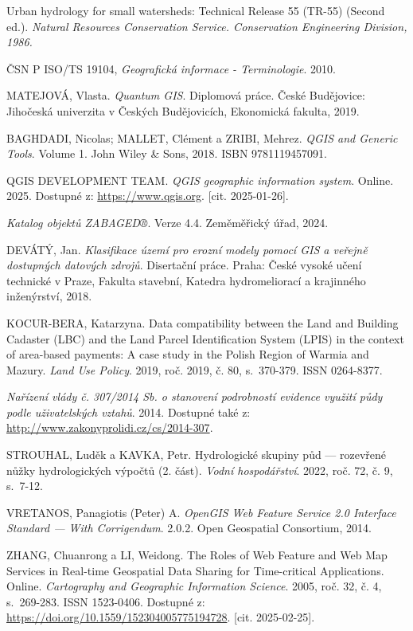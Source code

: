 \documentclass[a4paper,oneside,12pt]{book}
\begin{document}
\begin{thebibliography}{1}
Urban hydrology for small watersheds: Technical Release 55 (TR-55) (Second ed.).
\textit{ Natural Resources Conservation Service. Conservation Engineering Division, 1986.}


ČSN P ISO/TS 19104, \textit{Geografická informace - Terminologie}. 2010.

MATEJOVÁ, Vlasta. \textit{Quantum GIS}. Diplomová práce. České Budějovice: Jihočeská univerzita v Českých Budějovicích, Ekonomická fakulta, 2019.

BAGHDADI, Nicolas; MALLET, Clément a ZRIBI, Mehrez. \textit{QGIS and Generic Tools}. Volume 1. John Wiley \& Sons, 2018. ISBN 9781119457091.

QGIS DEVELOPMENT TEAM. \textit{QGIS geographic information system}. Online. 2025. Dostupné z: \url{https://www.qgis.org}. [cit. 2025-01-26].

\textit{Katalog objektů ZABAGED®}. Verze 4.4. Zeměměřický úřad, 2024.


DEVÁTÝ, Jan. \textit{Klasifikace území pro erozní modely pomocí GIS a veřejně dostupných datových zdrojů}. Disertační práce. Praha: České vysoké učení technické v Praze, Fakulta stavební, Katedra hydromeliorací a krajinného inženýrství, 2018.

KOCUR-BERA, Katarzyna. Data compatibility between the Land and Building Cadaster (LBC) and the Land Parcel Identification System (LPIS) in the context of area-based payments: A case study in the Polish Region of Warmia and Mazury. \textit{Land Use Policy}. 2019, roč. 2019, č. 80, s.~370-379. ISSN 0264-8377.

\textit{Nařízení vlády č. 307/2014 Sb. o stanovení podrobností evidence využití půdy podle uživatelských vztahů}. 2014. Dostupné také z: \url{http://www.zakonyprolidi.cz/cs/2014-307}.

STROUHAL, Luděk a KAVKA, Petr. Hydrologické skupiny půd --- rozevřené nůžky hydrologických výpočtů (2. část). \textit{Vodní hospodářství}. 2022, roč. 72, č. 9, s.~7-12.

VRETANOS, Panagiotis (Peter) A. \textit{OpenGIS Web Feature Service 2.0 Interface Standard --- With Corrigendum}. 2.0.2. Open Geospatial Consortium, 2014.

ZHANG, Chuanrong a LI, Weidong. The Roles of Web Feature and Web Map Services in Real-time Geospatial Data Sharing for Time-critical Applications. Online. \textit{Cartography and Geographic Information Science}. 2005, roč. 32, č. 4, s.~269-283. ISSN 1523-0406. Dostupné z: \url{https://doi.org/10.1559/152304005775194728}. [cit. 2025-02-25].


\end{thebibliography}
\end{document}
